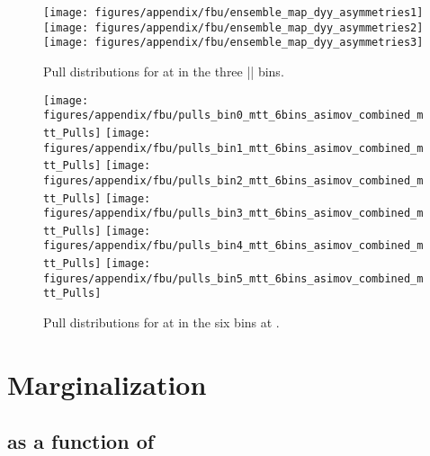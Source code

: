 \begin{figure}
  \begin{center}
  \texttt{[image: figures/appendix/fbu/ensemble\_map\_dyy\_asymmetries1]}
  \texttt{[image: figures/appendix/fbu/ensemble\_map\_dyy\_asymmetries2]}
  \texttt{[image: figures/appendix/fbu/ensemble\_map\_dyy\_asymmetries3]}
  \caption{
    \label{fig:app:pulls_vs_y}
    Pull distributions for \ac{} at \seventev{} in the three |\ytt{}| bins.
  }
  \end{center}
\end{figure}

\begin{figure}
  \begin{center}
    \texttt{[image: figures/appendix/fbu/pulls\_bin0\_mtt\_6bins\_asimov\_combined\_mtt\_Pulls]}
    \texttt{[image: figures/appendix/fbu/pulls\_bin1\_mtt\_6bins\_asimov\_combined\_mtt\_Pulls]}
    \texttt{[image: figures/appendix/fbu/pulls\_bin2\_mtt\_6bins\_asimov\_combined\_mtt\_Pulls]}
    \texttt{[image: figures/appendix/fbu/pulls\_bin3\_mtt\_6bins\_asimov\_combined\_mtt\_Pulls]}
    \texttt{[image: figures/appendix/fbu/pulls\_bin4\_mtt\_6bins\_asimov\_combined\_mtt\_Pulls]}
    \texttt{[image: figures/appendix/fbu/pulls\_bin5\_mtt\_6bins\_asimov\_combined\_mtt\_Pulls]}
  \caption{
    \label{fig:app:pulls_vs_mass8tev}
    Pull distributions for \ac{} at \eighttev{} in the six \mtt{} bins at \eighttev{}.
  }
  \end{center}
\end{figure}

\section{Marginalization}
\label{app:unfolding:marginalization}

\subsection{\ac{} as a function of \mtt{}}

